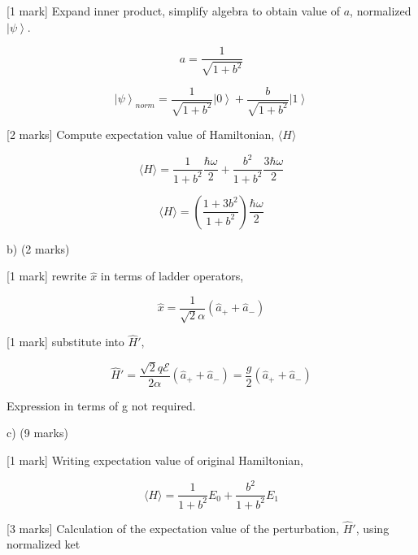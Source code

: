 \documentclass[a4paper,11pt]{article}
\begin{document}
[1 mark] Expand inner product, simplify algebra to obtain value of \( a \), normalized \( \left| \psi \right> \).

\[ a = \frac{1}{\sqrt{1+b^2}} \]

\[ \left| \psi \right>_{norm} = \frac{1}{\sqrt{1+b^2}} \left| 0 \right> + \frac{b}{\sqrt{1+b^2}} \left| 1 \right> \]

[2 marks] Compute expectation value of Hamiltonian, \( \langle H \rangle \) 

\[ \langle H \rangle = \frac{1}{1+b^2} \frac{\hbar \omega}{2} + \frac{b^2}{1+b^2} \frac{3\hbar \omega}{2} \]

\[ \langle H \rangle = \left ( \frac{1+3b^2}{1+b^2} \right) \frac{\hbar \omega}{2} \]

b) (2 marks)

[1 mark] rewrite \( \hat{x} \) in terms of ladder operators,

\[ \hat{x} = \frac{1}{\sqrt{2} \alpha} (\hat{a}_{+} + \hat{a}_{-}) \]

[1 mark] substitute into \( \hat{H}' \), 

\[ \hat{H}' = \frac{\sqrt{2} q \mathcal{E}}{2 \alpha} (\hat{a}_{+} + \hat{a}_{-}) = \frac{g}{2} (\hat{a}_{+} + \hat{a}_{-}) \]

Expression in terms of g not required. 

c) (9 marks)

[1 mark] Writing expectation value of original Hamiltonian, 

\[ \langle H \rangle = \frac{1}{1+b^2} E_0 + \frac{b^2}{1+b^2} E_1 \]

[3 marks] Calculation of the expectation value of the perturbation, \( \hat{H}' \), using normalized ket
\end{document}
